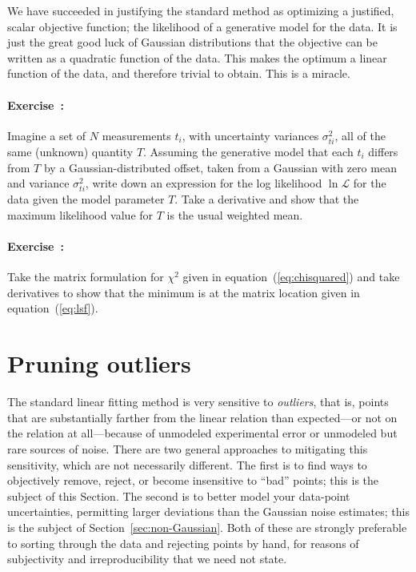 \documentclass[12pt,twoside]{article}
\newcommand{\sectionname}{Section}
\newcommand{\equationname}{equation}
\newcommand{\problemname}{Exercise}
\newcounter{problem}
\newenvironment{problem}{\paragraph{\problemname~\theproblem:}\refstepcounter{problem}}{}
\newcommand{\like}{\mathscr{L}}
\begin{document}
We have succeeded in justifying the standard method as optimizing a
justified, scalar objective function; the likelihood of a generative
model for the data.  It is just the great good luck of Gaussian
distributions that the objective can be written as a quadratic
function of the data.  This makes the optimum a linear function of the
data, and therefore trivial to obtain.  This is a miracle.

\begin{problem}
Imagine a set of $N$ measurements $t_i$, with uncertainty variances
$\sigma_{ti}^2$, all of the same (unknown) quantity $T$.  Assuming the
generative model that each $t_i$ differs from $T$ by a
Gaussian-distributed offset, taken from a Gaussian with zero mean and
variance $\sigma_{ti}^2$, write down an expression for the log
likelihood $\ln\like$ for the data given the model parameter $T$.
Take a derivative and show that the maximum likelihood value for $T$
is the usual weighted mean.
\end{problem}

\begin{problem}
Take the matrix formulation for $\chi^2$ given in
\equationname~(\ref{eq:chisquared}) and take derivatives to show that
the minimum is at the matrix location given in
\equationname~(\ref{eq:lsf}).
\end{problem}

\section{Pruning outliers}\label{sec:outliers}

The standard linear fitting method is very sensitive to
\emph{outliers}, that is, points that are substantially farther from
the linear relation than expected---or not on the relation at
all---because of unmodeled experimental error or unmodeled but rare
sources of noise.  There are two general approaches to mitigating this
sensitivity, which are not necessarily different.  The first is to
find ways to objectively remove, reject, or become insensitive to
``bad'' points; this is the subject of this \sectionname.  The second
is to better model your data-point uncertainties, permitting larger
deviations than the Gaussian noise estimates; this is the subject of
\sectionname~\ref{sec:non-Gaussian}.  Both of these are strongly
preferable to sorting through the data and rejecting points by hand,
for reasons of subjectivity and irreproducibility that we need not
state.
\end{document}
